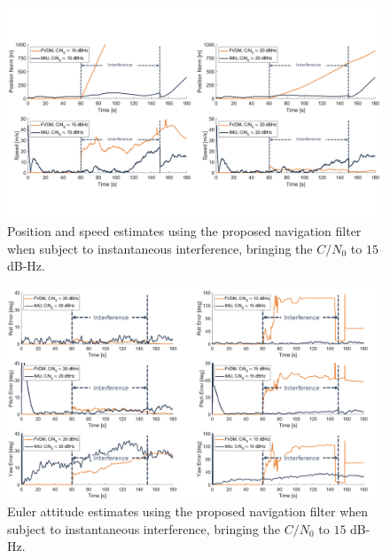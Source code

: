 \begin{figure}[!ht]
    \centering
    \includegraphics[width=\linewidth]{Figures/doubleresults/Slide3.PNG}
    \caption{Position and speed estimates using the proposed navigation filter when subject to instantaneous interference, bringing the \(C/N_0\) to \(15\) dB-Hz.}\label{fig:PosVel1520}
\end{figure}

\begin{figure}[!ht]
    \centering
    \includegraphics[width=\linewidth]{Figures/doubleresults/Slide1.PNG}
    \caption{Euler attitude estimates using the proposed navigation filter when subject to instantaneous interference, bringing the \(C/N_0\) to \(15\) dB-Hz.}\label{fig:Eul15}
\end{figure}



